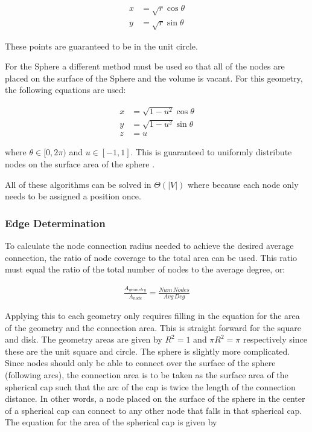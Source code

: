 \documentclass{article}
\begin{document}
        \begin{align}
            x &= \sqrt{r}\cos\theta \\
            y &= \sqrt{r}\sin\theta
        \end{align}

        These points are guaranteed to be in the unit circle.
        \par
        For the Sphere a different method must be used so that all of the nodes are placed on the surface of the Sphere and the volume is vacant. For this geometry, the following equations are used:

        \begin{align}
            x &= \sqrt{1-u^2}\cos\theta \\
            y &= \sqrt{1-u^2}\sin\theta \\
            z &= u
        \end{align}

        where $\theta \in [0,2\pi)$ and $u \in [-1,1]$. This is guaranteed to uniformly distribute nodes on the surface area of the sphere \cite{spherepoints}.
        \par
        All of these algorithms can be solved in $\Theta\left(|V|\right)$ where because each node only needs to be assigned a position once.

        \subsubsection{Edge Determination}
        To calculate the node connection radius needed to achieve the desired average connection, the ratio of node coverage to the total area can be used. This ratio must equal the ratio of the total number of nodes to the average degree, or:

        \begin{align}
            \frac{A_{geometry}}{A_{node}}= \frac{Num\,Nodes}{Avg\,Deg}
        \end{align}

        Applying this to each geometry only requires filling in the equation for the area of the geometry and the connection area. This is straight forward for the square and disk. The geometry areas are given by $R^2 = 1$ and $\pi R^2 = \pi$ respectively since these are the unit square and circle. The sphere is slightly more complicated. Since nodes should only be able to connect over the surface of the sphere (following arcs), the connection area is to be taken as the surface area of the spherical cap such that the arc of the cap is twice the length of the connection distance. In other words, a node placed on the surface of the sphere in the center of a spherical cap can connect to any other node that falls in that spherical cap. The equation for the area of the spherical cap is given by
\end{document}
